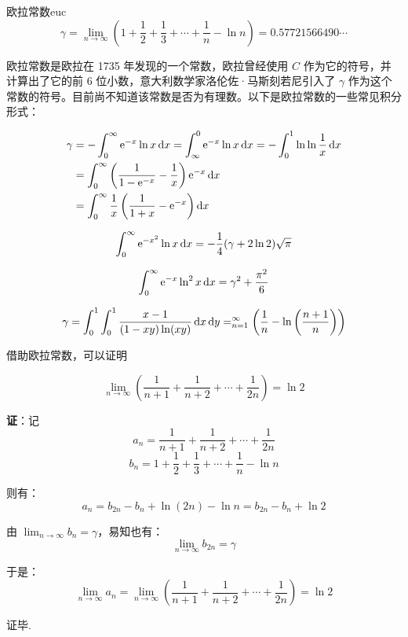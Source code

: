 \documentclass[12pt, cn]{elegantart}
\begin{document}
\begin{theorem}{欧拉常数}{euc}
\begin{equation}
		\gamma=\lim _{n \rightarrow \infty}\left( 1+\frac{1}{2}+\frac{1}{3}+\cdots+\frac{1}{n} -\ln n\right)=0.57721566490\cdots
\end{equation}

欧拉常数是欧拉在 1735 年发现的一个常数，欧拉曾经使用 $C$ 作为它的符号，并计算出了它的前 6 位小数，意大利数学家洛伦佐·马斯刻若尼引入了 $\gamma$ 作为这个常数的符号。目前尚不知道该常数是否为有理数。以下是欧拉常数的一些常见积分形式：

\begin{align*} 
	\gamma &=-\int_{0}^{\infty} \mathrm{e}^{-x} \ln x \mathop{}\!\mathrm{d} x=\int_{\infty}^{0} \mathrm{e}^{-x} \ln x \mathop{}\!\mathrm{d} x=-\int_{0}^{1} \ln \ln \frac{1}{x} \mathop{}\!\mathrm{d} x \\ &=\int_{0}^{\infty}\left(\frac{1}{1-\mathrm{e}^{-x}}-\frac{1}{x}\right) \mathrm{e}^{-x} \mathop{}\!\mathrm{d} x \\ &=\int_{0}^{\infty} \frac{1}{x}\left(\frac{1}{1+x}-\mathrm{e}^{-x}\right) \mathop{}\!\mathrm{d} x
	\end{align*}
	
	\begin{equation*}
		\int_{0}^{\infty} \mathrm{e}^{-x^{2}} \ln x \mathop{}\!\mathrm{d} x=-\frac{1}{4}(\gamma+2 \ln 2) \sqrt{\pi}
	\end{equation*}
	
	\begin{equation*}
		\int_{0}^{\infty} \mathrm{e}^{-x} \ln ^{2} x \mathop{}\!\mathrm{d} x=\gamma^{2}+\frac{\pi^{2}}{6}
	\end{equation*}
	
	\begin{equation*}
		\gamma=\int_{0}^{1} \int_{0}^{1} \frac{x-1}{(1-x y) \ln (x y)} \mathop{}\!\mathrm{d} x \mathop{}\!\mathrm{d} y=\relax_{n=1}^{\infty}\left(\frac{1}{n}-\ln\left( \frac{n+1}{n}\right)\right)
	\end{equation*}

	借助欧拉常数，可以证明
	
	$$\displaystyle \lim _{n \rightarrow \infty}\left(\frac{1}{n+1}+\frac{1}{n+2}+\cdots+\frac{1}{2 n}\right)=\ln 2$$

	\textbf{证}：记
	$$a_{n}=\frac{1}{n+1}+\frac{1}{n+2}+\cdots+\frac{1}{2 n}$$
	$$b_{n}=1+\frac{1}{2}+\frac{1}{3}+\cdots+\frac{1}{n} -\ln n$$
	
	则有：
	$$a_{n}=b_{2 n}-b_{n}+\ln (2 n)-\ln n=b_{2 n}-b_{n}+\ln 2$$
	
	由 $\displaystyle \lim_{n \rightarrow \infty} b_{n}=\gamma$，易知也有：
	$$\lim _{n \rightarrow \infty} b_{2 n}=\gamma$$
	
	于是：
	$$\lim _{n \rightarrow \infty} a_{n}=\lim _{n \rightarrow \infty}\left(\frac{1}{n+1}+\frac{1}{n+2}+\cdots+\frac{1}{2 n}\right)=\ln 2$$
	
	证毕.

\end{theorem}
\end{document}
